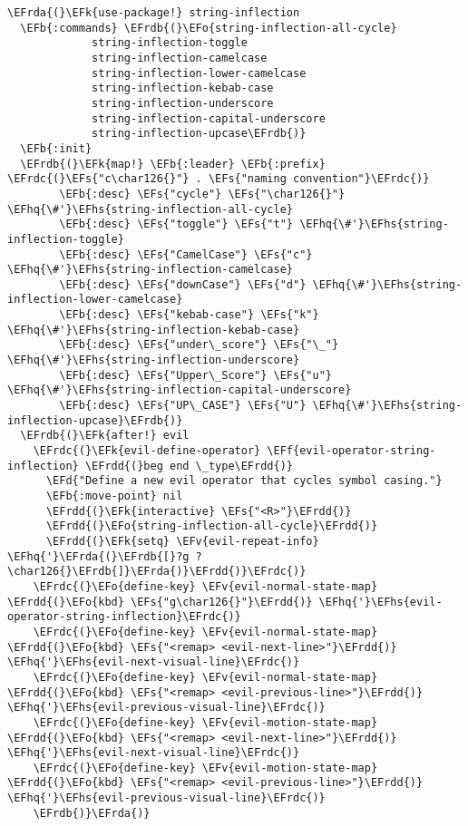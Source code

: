 \documentclass[a4wide,10pt]{article}
\newcommand{\EFs}[1]{\textcolor{EFs}{#1}} %
\newcommand{\EFd}[1]{\textcolor{EFd}{#1}} %
\newcommand{\EFk}[1]{\textcolor{EFk}{#1}} %
\newcommand{\EFb}[1]{\textcolor{EFb}{#1}} %
\newcommand{\EFf}[1]{\textcolor{EFf}{#1}} %
\newcommand{\EFv}[1]{\textcolor{EFv}{#1}} %
\newcommand{\EFo}[1]{\textcolor{EFo}{#1}} %
\newcommand{\EFhq}[1]{\textcolor{EFhq}{#1}} %
\newcommand{\EFhs}[1]{\textcolor{EFhs}{#1}} %
\newcommand{\EFrda}[1]{\textcolor{EFrda}{#1}} %
\newcommand{\EFrdb}[1]{\textcolor{EFrdb}{#1}} %
\newcommand{\EFrdc}[1]{\textcolor{EFrdc}{#1}} %
\newcommand{\EFrdd}[1]{\textcolor{EFrdd}{#1}} %
\begin{document}
\begin{Code}
\begin{Verbatim}
\EFrda{(}\EFk{use-package!} string-inflection
  \EFb{:commands} \EFrdb{(}\EFo{string-inflection-all-cycle}
             string-inflection-toggle
             string-inflection-camelcase
             string-inflection-lower-camelcase
             string-inflection-kebab-case
             string-inflection-underscore
             string-inflection-capital-underscore
             string-inflection-upcase\EFrdb{)}
  \EFb{:init}
  \EFrdb{(}\EFk{map!} \EFb{:leader} \EFb{:prefix} \EFrdc{(}\EFs{"c\char126{}"} . \EFs{"naming convention"}\EFrdc{)}
        \EFb{:desc} \EFs{"cycle"} \EFs{"\char126{}"} \EFhq{\#'}\EFhs{string-inflection-all-cycle}
        \EFb{:desc} \EFs{"toggle"} \EFs{"t"} \EFhq{\#'}\EFhs{string-inflection-toggle}
        \EFb{:desc} \EFs{"CamelCase"} \EFs{"c"} \EFhq{\#'}\EFhs{string-inflection-camelcase}
        \EFb{:desc} \EFs{"downCase"} \EFs{"d"} \EFhq{\#'}\EFhs{string-inflection-lower-camelcase}
        \EFb{:desc} \EFs{"kebab-case"} \EFs{"k"} \EFhq{\#'}\EFhs{string-inflection-kebab-case}
        \EFb{:desc} \EFs{"under\_score"} \EFs{"\_"} \EFhq{\#'}\EFhs{string-inflection-underscore}
        \EFb{:desc} \EFs{"Upper\_Score"} \EFs{"u"} \EFhq{\#'}\EFhs{string-inflection-capital-underscore}
        \EFb{:desc} \EFs{"UP\_CASE"} \EFs{"U"} \EFhq{\#'}\EFhs{string-inflection-upcase}\EFrdb{)}
  \EFrdb{(}\EFk{after!} evil
    \EFrdc{(}\EFk{evil-define-operator} \EFf{evil-operator-string-inflection} \EFrdd{(}beg end \_type\EFrdd{)}
      \EFd{"Define a new evil operator that cycles symbol casing."}
      \EFb{:move-point} nil
      \EFrdd{(}\EFk{interactive} \EFs{"<R>"}\EFrdd{)}
      \EFrdd{(}\EFo{string-inflection-all-cycle}\EFrdd{)}
      \EFrdd{(}\EFk{setq} \EFv{evil-repeat-info} \EFhq{'}\EFrda{(}\EFrdb{[}?g ?\char126{}\EFrdb{]}\EFrda{)}\EFrdd{)}\EFrdc{)}
    \EFrdc{(}\EFo{define-key} \EFv{evil-normal-state-map} \EFrdd{(}\EFo{kbd} \EFs{"g\char126{}"}\EFrdd{)} \EFhq{'}\EFhs{evil-operator-string-inflection}\EFrdc{)}
    \EFrdc{(}\EFo{define-key} \EFv{evil-normal-state-map} \EFrdd{(}\EFo{kbd} \EFs{"<remap> <evil-next-line>"}\EFrdd{)} \EFhq{'}\EFhs{evil-next-visual-line}\EFrdc{)}
    \EFrdc{(}\EFo{define-key} \EFv{evil-normal-state-map} \EFrdd{(}\EFo{kbd} \EFs{"<remap> <evil-previous-line>"}\EFrdd{)} \EFhq{'}\EFhs{evil-previous-visual-line}\EFrdc{)}
    \EFrdc{(}\EFo{define-key} \EFv{evil-motion-state-map} \EFrdd{(}\EFo{kbd} \EFs{"<remap> <evil-next-line>"}\EFrdd{)} \EFhq{'}\EFhs{evil-next-visual-line}\EFrdc{)}
    \EFrdc{(}\EFo{define-key} \EFv{evil-motion-state-map} \EFrdd{(}\EFo{kbd} \EFs{"<remap> <evil-previous-line>"}\EFrdd{)} \EFhq{'}\EFhs{evil-previous-visual-line}\EFrdc{)}
    \EFrdb{)}\EFrda{)}


\end{Verbatim}
\end{Code}
\end{document}
